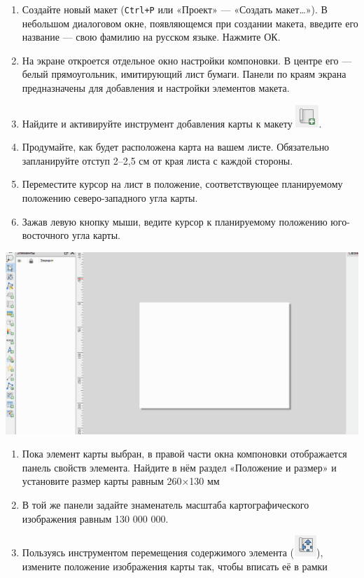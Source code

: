 \documentclass[
  12pt,
]{book}
\begin{document}
\begin{enumerate}
\def\labelenumi{\arabic{enumi}.}
\item
  Создайте новый макет (\texttt{Ctrl+P} или «Проект» --- «Создать макет\ldots»). В небольшом диалоговом окне, появляющемся при создании макета, введите его название --- свою фамилию на русском языке. Нажмите ОК.
\item
  На экране откроется отдельное окно настройки компоновки. В центре его --- белый прямоугольник, имитирующий лист бумаги. Панели по краям экрана предназначены для добавления и настройки элементов макета.
\item
  Найдите и активируйте инструмент добавления карты к макету \includegraphics{images/Ex01_WorldMap/addMapTool.png}.
\item
  Продумайте, как будет расположена карта на вашем листе. Обязательно запланируйте отступ 2--2,5 см от края листа с каждой стороны.
\item
  Переместите курсор на лист в положение, соответствующее планируемому положению северо-западного угла карты.
\item
  Зажав левую кнопку мыши, ведите курсор к планируемому положению юго-восточного угла карты.
\end{enumerate}

\includegraphics{images/Ex01_WorldMap/addMap.gif}

\begin{enumerate}
\def\labelenumi{\arabic{enumi}.}
\setcounter{enumi}{6}
\item
  Пока элемент карты выбран, в правой части окна компоновки отображается панель свойств элемента. Найдите в нём раздел «Положение и размер» и установите размер карты равным 260×130 мм
\item
  В той же панели задайте знаменатель масштаба картографического изображения равным 130 000 000.
\item
  Пользуясь инструментом перемещения содержимого элемента (\includegraphics{images/Ex01_WorldMap/moveElementButton.png}), измените положение изображения карты так, чтобы вписать её в рамки
\end{enumerate}
\end{document}
